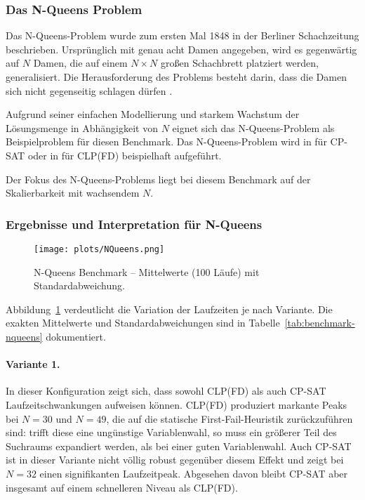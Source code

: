 \documentclass[12pt,a4paper]{article}
\begin{document}
\subsubsection{Das N-Queens Problem}
Das N-Queens-Problem wurde zum ersten Mal 1848 in der Berliner Schachzeitung beschrieben.
Ursprünglich mit genau acht Damen angegeben, wird es gegenwärtig auf $N$ Damen, die auf einem $N \times N$ großen Schachbrett platziert werden, generalisiert.
Die Herausforderung des Problems besteht darin, dass die Damen sich nicht gegenseitig schlagen dürfen \cite{nqueens}.

Aufgrund seiner einfachen Modellierung und starkem Wachstum der Lösungsmenge in Abhängigkeit von $N$ eignet sich das N-Queens-Problem als Beispielproblem für diesen Benchmark.
Das N-Queens-Problem wird in \cite{ortools} für CP-SAT oder in \cite{drt} für CLP(FD) beispielhaft aufgeführt. 

Der Fokus des N-Queens-Problems liegt bei diesem Benchmark auf der Skalierbarkeit mit wachsendem $N$.
\subsubsection{Ergebnisse und Interpretation für N-Queens}

\begin{figure}[htbp]
  \centering
  \texttt{[image: plots/NQueens.png]}
  \caption{N-Queens Benchmark – Mittelwerte (100 Läufe) mit Standardabweichung.}
  \label{fig:nqueens}
\end{figure}

\noindent
Abbildung~\ref{fig:nqueens} verdeutlicht die Variation der Laufzeiten je nach Variante.
Die exakten Mittelwerte und Standardabweichungen sind in Tabelle~\ref{tab:benchmark-nqueens} dokumentiert.

\paragraph{Variante 1.}
In dieser Konfiguration zeigt sich, dass sowohl CLP(FD) als auch CP-SAT Laufzeitschwankungen aufweisen können. 
CLP(FD) produziert markante Peaks bei $N=30$ und $N=49$, die auf die statische First-Fail-Heuristik zurückzuführen sind: 
trifft diese eine ungünstige Variablenwahl, so muss ein größerer Teil des Suchraums expandiert werden, als bei einer \glqq guten\grqq{} Variablenwahl. 
Auch CP-SAT ist in dieser Variante nicht völlig robust gegenüber diesem Effekt und zeigt bei $N=32$ einen signifikanten Laufzeitpeak. 
Abgesehen davon bleibt CP-SAT aber insgesamt auf einem schnelleren Niveau als CLP(FD).
\end{document}

